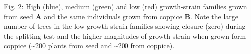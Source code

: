 Fig. 2: High (blue), medium (green) and low (red) growth-strain families grown from seed \textbf{A} and the same individuals grown from coppice \textbf{B}. Note the large number of trees in the low growth-strain families showing closure (zero) during the splitting test and the higher magnitudes of growth-strain when grown form coppice (\sim 200 plants from seed and \sim 200 from coppice).